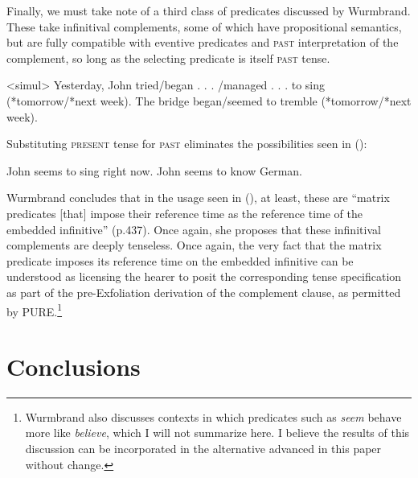 \documentclass[output=paper]{langscibook}
\begin{document}
Finally, we must take note of a third class of predicates discussed by Wurmbrand. These take infinitival complements, some of which have propositional semantics, but are fully compatible with eventive predicates and \textsc{past} interpretation of the complement, so long as the selecting predicate is itself \textsc{past }tense.

\pex<simul>
\a Yesterday, John tried/began . . . /managed . . . to sing (*tomorrow/*next week).
\a The bridge began/seemed to tremble (*tomorrow/*next week).
\xe

\noindent Substituting \textsc{present} tense for \textsc{past }eliminates
the possibilities seen in \noindent ():

\a \ljudge*John seems to sing right now.
\a John seems to know German.
\xe

Wurmbrand concludes that in the usage seen in \noindent (), at least, these are “matrix predicates {[}that{]} impose their reference time as the reference time of the embedded infinitive” (p.437). Once again, she proposes that these infinitival complements are deeply tenseless. Once again, the very fact that the matrix predicate imposes its reference time on the embedded infinitive can be understood as licensing the hearer to posit the corresponding tense specification as part of the pre-Exfoliation derivation of the complement clause, as permitted by PURE.\footnote{\noindent Wurmbrand also discusses contexts in which predicates such as \textit{seem} behave more like \textit{believe}, which I will not summarize here. I believe the results of this discussion can be incorporated in the alternative advanced in this paper without change. }

\section{Conclusions}
\end{document}
